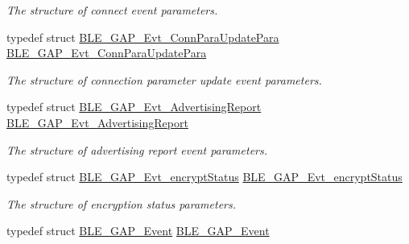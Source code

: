 \begin{DoxyCompactItemize}
\begin{DoxyCompactList}\small\item\em The structure of connect event parameters. \end{DoxyCompactList}\item 
typedef struct \hyperlink{struct_b_l_e___g_a_p___evt___conn_para_update_para}{B\+L\+E\+\_\+\+G\+A\+P\+\_\+\+Evt\+\_\+\+Conn\+Para\+Update\+Para} \hyperlink{group___b_l_e___g_a_p_ga5e30330944870ff17624bafb59f28e61}{B\+L\+E\+\_\+\+G\+A\+P\+\_\+\+Evt\+\_\+\+Conn\+Para\+Update\+Para}\hypertarget{group___b_l_e___g_a_p_ga5e30330944870ff17624bafb59f28e61}{}\label{group___b_l_e___g_a_p_ga5e30330944870ff17624bafb59f28e61}

\begin{DoxyCompactList}\small\item\em The structure of connection parameter update event parameters. \end{DoxyCompactList}\item 
typedef struct \hyperlink{struct_b_l_e___g_a_p___evt___advertising_report}{B\+L\+E\+\_\+\+G\+A\+P\+\_\+\+Evt\+\_\+\+Advertising\+Report} \hyperlink{group___b_l_e___g_a_p_gae4cce709f8f065d0bdc043dbacd8d625}{B\+L\+E\+\_\+\+G\+A\+P\+\_\+\+Evt\+\_\+\+Advertising\+Report}\hypertarget{group___b_l_e___g_a_p_gae4cce709f8f065d0bdc043dbacd8d625}{}\label{group___b_l_e___g_a_p_gae4cce709f8f065d0bdc043dbacd8d625}

\begin{DoxyCompactList}\small\item\em The structure of advertising report event parameters. \end{DoxyCompactList}\item 
typedef struct \hyperlink{struct_b_l_e___g_a_p___evt__encrypt_status}{B\+L\+E\+\_\+\+G\+A\+P\+\_\+\+Evt\+\_\+encrypt\+Status} \hyperlink{group___b_l_e___g_a_p_gadb3b755edbe8fb1487aaabbbda02b585}{B\+L\+E\+\_\+\+G\+A\+P\+\_\+\+Evt\+\_\+encrypt\+Status}\hypertarget{group___b_l_e___g_a_p_gadb3b755edbe8fb1487aaabbbda02b585}{}\label{group___b_l_e___g_a_p_gadb3b755edbe8fb1487aaabbbda02b585}

\begin{DoxyCompactList}\small\item\em The structure of encryption status parameters. \end{DoxyCompactList}\item 
typedef struct \hyperlink{struct_b_l_e___g_a_p___event}{B\+L\+E\+\_\+\+G\+A\+P\+\_\+\+Event} \hyperlink{group___b_l_e___g_a_p_gaf14385a2ad0c5a6191b71758c98974f6}{B\+L\+E\+\_\+\+G\+A\+P\+\_\+\+Event}\hypertarget{group___b_l_e___g_a_p_gaf14385a2ad0c5a6191b71758c98974f6}{}\label{group___b_l_e___g_a_p_gaf14385a2ad0c5a6191b71758c98974f6}


\end{DoxyCompactItemize}
